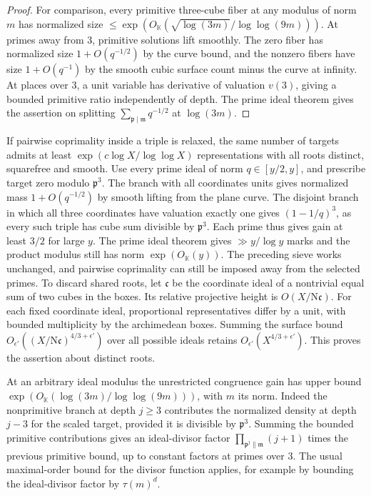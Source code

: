 \documentclass[11pt,letterpaper]{article}
\theoremstyle{definition}
\numberwithin{equation}{section}
\begin{document}
\begin{proof}
For comparison, every primitive three-cube fiber at any modulus
of norm $m$ has normalized size
$\le\exp(O_{\mathbb K}(\sqrt{\log(3m)}/\log\log(9m)))$.
At primes away from $3$, primitive solutions lift smoothly. The
zero fiber has normalized size $1+O(q^{-1/2})$ by the curve
bound, and the nonzero fibers have size $1+O(q^{-1})$ by the
smooth cubic surface count minus the curve at infinity. At
places over $3$, a unit variable has derivative of valuation
$v(3)$, giving a bounded primitive ratio independently of depth.
The prime ideal theorem gives the assertion on splitting
$\sum_{\mathfrak p\mid\mathfrak m}q^{-1/2}$ at $\log(3m)$.
\end{proof}

If pairwise coprimality inside a triple is relaxed, the same
number of targets admits at least $\exp(c\log X/\log\log X)$
representations with all roots distinct, squarefree and smooth.
Use every prime ideal of norm $q\in[y/2,y]$, and prescribe
target zero modulo $\mathfrak p^3$. The branch with all coordinates
units gives normalized mass $1+O(q^{-1/2})$ by smooth lifting from
the plane curve. The disjoint branch in which all three coordinates
have valuation exactly one gives $(1-1/q)^3$, as every such triple
has cube sum divisible by $\mathfrak p^3$. Each prime thus gives
gain at least $3/2$ for large $y$. The prime ideal theorem gives
$\gg y/\log y$ marks and the product modulus still has norm
$\exp(O_{\mathbb K}(y))$. The preceding sieve works unchanged,
and pairwise coprimality can still be imposed away from the
selected primes. To discard shared roots, let $\mathfrak c$ be the
coordinate ideal of a nontrivial equal sum of two cubes in the boxes.
Its relative projective height is $O(X/\mathrm N\mathfrak c)$.
For each fixed coordinate ideal, proportional representatives
differ by a unit, with bounded multiplicity by the archimedean
boxes. Summing the surface bound
$O_{\epsilon'}((X/\mathrm N\mathfrak c)^{4/3+\epsilon'})$
over all possible ideals retains $O_{\epsilon'}(X^{4/3+\epsilon'})$.
This proves the assertion about distinct roots.

At an arbitrary ideal modulus the unrestricted congruence gain has
upper bound $\exp(O_{\mathbb K}(\log(3m)/\log\log(9m)))$,
with $m$ its norm. Indeed the nonprimitive branch at depth
$j\ge3$ contributes the normalized density at depth $j-3$ for the
scaled target, provided it is divisible by $\mathfrak p^3$.
Summing the bounded primitive contributions gives an ideal-divisor
factor $\prod_{\mathfrak p^j\parallel\mathfrak m}(j+1)$ times the
previous primitive bound, up to constant factors at primes over $3$.
The usual maximal-order bound for the divisor function applies,
for example by bounding the ideal-divisor factor by $\tau(m)^d$.
\end{document}
